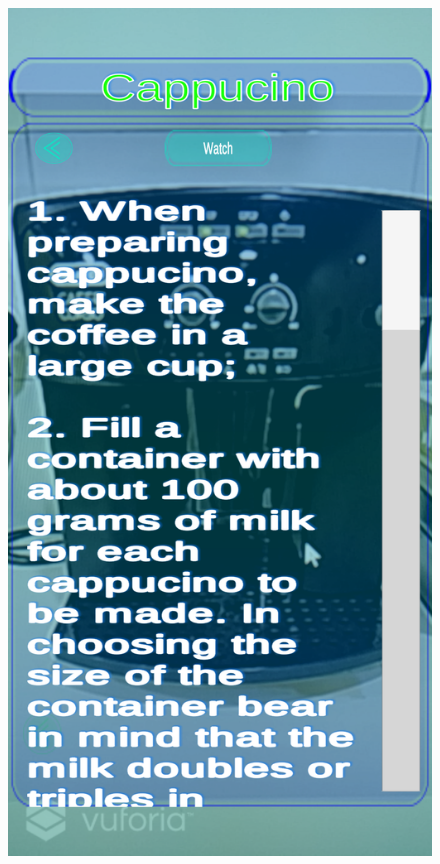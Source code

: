 \documentclass{aifyp}
\begin{document}
\begin{appendices}
\begin{figure}[H]
\begin{minipage}{.5\textwidth}
          \label{fig:CoffeeMachineAugmentationMenu}
        \end{minipage}%
        \begin{minipage}{.5\textwidth}
          \centering
          \includegraphics[scale=0.2]{Images/Chapter5/Impl16Overwritten.png}

\end{minipage}
\end{figure}
\end{appendices}
\end{document}
